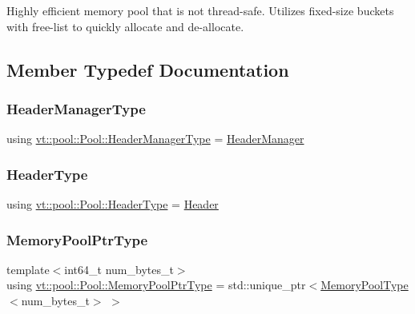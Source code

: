Highly efficient memory pool that is not thread-\/safe. Utilizes fixed-\/size buckets with free-\/list to quickly allocate and de-\/allocate. 

\subsection{Member Typedef Documentation}
\mbox{\label{structvt_1_1pool_1_1_pool_acc5ad2d64bf6ff58fead958a69c12d74}} 
\subsubsection{\texorpdfstring{Header\+Manager\+Type}{HeaderManagerType}}
{\footnotesize\ttfamily using \hyperlink{structvt_1_1pool_1_1_pool_acc5ad2d64bf6ff58fead958a69c12d74}{vt\+::pool\+::\+Pool\+::\+Header\+Manager\+Type} =  \hyperlink{structvt_1_1pool_1_1_header_manager}{Header\+Manager}}

\mbox{\label{structvt_1_1pool_1_1_pool_a887de970f8d8fbec63df120348c31404}} 
\subsubsection{\texorpdfstring{Header\+Type}{HeaderType}}
{\footnotesize\ttfamily using \hyperlink{structvt_1_1pool_1_1_pool_a887de970f8d8fbec63df120348c31404}{vt\+::pool\+::\+Pool\+::\+Header\+Type} =  \hyperlink{structvt_1_1pool_1_1_header}{Header}}

\mbox{\label{structvt_1_1pool_1_1_pool_a21e20f5b56c3bae4f0d0cc36ed9c5eee}} 
\subsubsection{\texorpdfstring{Memory\+Pool\+Ptr\+Type}{MemoryPoolPtrType}}
{\footnotesize\ttfamily template$<$int64\+\_\+t num\+\_\+bytes\+\_\+t$>$ \\
using \hyperlink{structvt_1_1pool_1_1_pool_a21e20f5b56c3bae4f0d0cc36ed9c5eee}{vt\+::pool\+::\+Pool\+::\+Memory\+Pool\+Ptr\+Type} =  std\+::unique\+\_\+ptr$<$\hyperlink{structvt_1_1pool_1_1_pool_a06673914350d933ad5205155eca14a3b}{Memory\+Pool\+Type}$<$num\+\_\+bytes\+\_\+t$>$ $>$}

